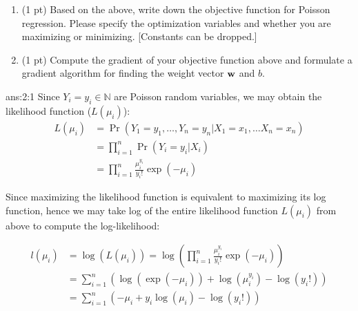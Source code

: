 \documentclass{tron}
\newcommand{\mref}[1]{\underline{\textbf{\hypersetup{linkcolor=orange}\Cref{#1}\hypersetup{linkcolor=blue}}}}
\begin{document}
\begin{exercise}{}
\begin{enumerate}
\item (1 pt) Based on the above, write down the objective function for Poisson regression. Please specify the optimization variables and whether you are maximizing or minimizing. [Constants can be dropped.]

\ans{\mref{ans:2:3}} 
	
\item (1 pt) Compute the gradient of your objective function above and formulate a gradient algorithm for finding the weight vector $\mathbf{w}$ and $b$. 
	
\ans{\mref{ans:2:4}} 

\end{enumerate}
\end{exercise}



\newpage
\setcounter{answer}{0}
\begin{answer}{ans:2:1}
	Since $Y_i={y_i} \in \mathds{N}$ are \iid Poisson random variables, we may obtain the likelihood function ($L(\mu_i)$):
	\begin{align}
		L(\mu_i) 	& = \Pr \left( Y_1=y_1, \dots, Y_n=y_n | X_1=x_1, \dots X_n=x_n \right) \\
					& = \prod_{i=1}^n {\Pr (Y_i = y_i | X_i)} \\
					& = \prod_{i=1}^n { \frac{\mu_i^{y_i}}{{y_i}!} \exp(-\mu_i) } 
	\end{align}
	
	Since maximizing the likelihood function is equivalent to maximizing its log function, hence we may take log of the entire likelihood function $L(\mu_i)$ from above to compute the log-likelihood:
	
	\begin{align}
		l(\mu_i) 	& = \log(L(\mu_i)) = \log \left( \prod_{i=1}^n { \frac{\mu_i^{y_i}}{{y_i}!} \exp(-\mu_i) } \right) \\
					& = \sum_{i=1}^n \left(  \log(\exp(-\mu_i)) + \log(\mu_i^{y_i}) - \log({y_i}!) \right) \\
					& = \sum_{i=1}^n \left(  -\mu_i + {y_i}\log(\mu_i) - \log({y_i}!) \right) 
	\end{align}
\end{answer}
\end{document}
